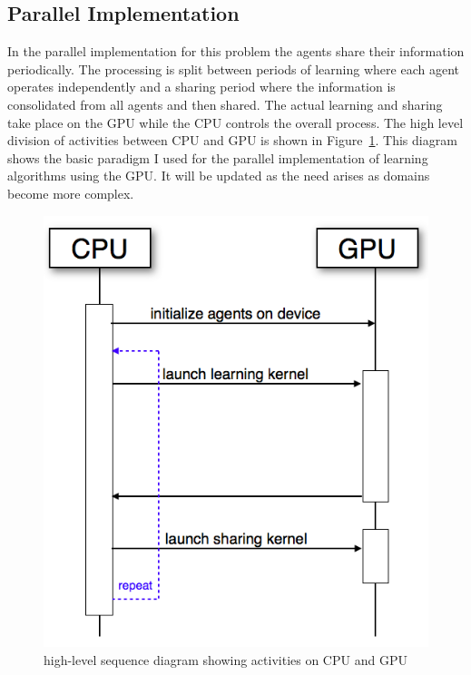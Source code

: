 \subsection{Parallel Implementation}
In the parallel implementation for this problem the agents share their information periodically.  The processing is split between periods of learning where each agent operates independently and a sharing period where the information is consolidated from all agents and then shared.  The actual learning and sharing take place on the GPU while the CPU controls the overall process.  The high level division of activities between CPU and GPU is shown in Figure~\ref{fig:seq_diag}.  This diagram shows the basic paradigm I used for the parallel implementation of learning algorithms using the GPU.  It will be updated as the need arises as domains become more complex.

\begin{figure}[hbtp]
\center
\includegraphics[scale=0.3]{fig01a}
\caption{high-level sequence diagram showing activities on CPU and GPU}
\label{fig:seq_diag}
\end{figure}

